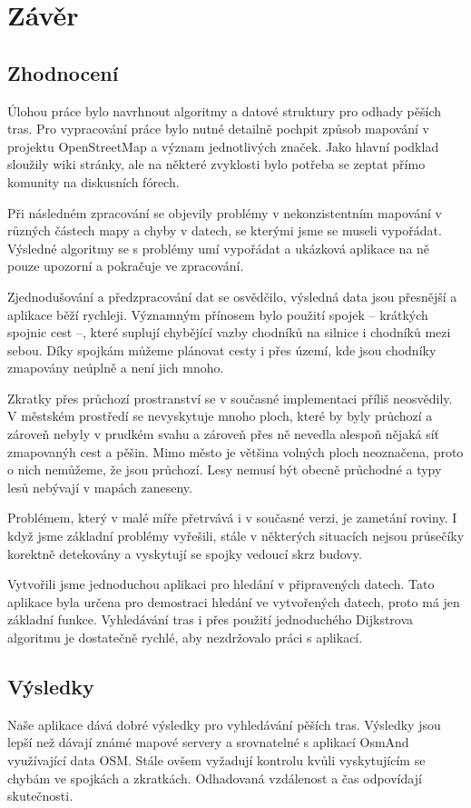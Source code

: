 \chapter*{Závěr}

\section{Zhodnocení}
Úlohou práce bylo navrhnout algoritmy a datové struktury pro odhady pěších tras.
Pro vypracování práce bylo nutné detailně pochpit způsob mapování v projektu
OpenStreetMap a význam jednotlivých značek. Jako hlavní podklad sloužily wiki
stránky, ale na některé zvyklosti bylo potřeba se zeptat přímo komunity na
diskusních fórech. 

Při následném zpracování se objevily problémy v nekonzistentním mapování v
různých částech mapy a chyby v datech, se kterými jsme se museli vypořádat.
Výsledné algoritmy se s problémy umí vypořádat a ukázková aplikace na ně pouze
upozorní a pokračuje ve zpracování. 

Zjednodušování a předzpracování dat se osvědčilo, výsledná data jsou přesnější a
aplikace běží rychleji. Významným přínosem bylo použití spojek -- krátkých
spojnic cest --, které suplují chybějící vazby chodníků na silnice i chodníků
mezi sebou. Díky spojkám můžeme plánovat cesty i přes území, kde jsou chodníky
zmapovány neúplně a není jich mnoho. 

Zkratky přes průchozí prostranství se v současné implementaci příliš neosvědily.
V městském prostředí se nevyskytuje mnoho ploch, které by byly průchozí a
zároveň nebyly v prudkém svahu a zároveň přes ně nevedla alespoň nějaká síť
zmapovanýh cest a pěšin. Mimo město je většina volných ploch neoznačena, proto o
nich nemůžeme, že jsou průchozí. Lesy nemusí být obecně průchodné a typy lesů
nebývají v mapách zaneseny. 

Problémem, který v malé míře přetrvává i v současné verzi, je zametání roviny.
I když jsme základní problémy vyřešili, stále v některých situacích nejsou
průsečíky korektně detekovány a vyskytují se spojky vedoucí skrz budovy.  

Vytvořili jsme jednoduchou aplikaci pro hledání v připravených datech. Tato
aplikace byla určena pro demostraci hledání ve vytvořených datech, proto má jen
základní funkce. Vyhledávání tras i přes použití jednoduchého Dijkstrova
algoritmu je dostatečně rychlé, aby nezdržovalo práci s aplikací. 

\section{Výsledky}
Naše aplikace dává dobré výsledky pro vyhledávání pěších tras. Výsledky jsou
lepší než dávají známé mapové servery a srovnatelné s aplikací OsmAnd
využívající data OSM. Stále ovšem vyžadují kontrolu kvůli vyskytujícím se chybám
ve spojkách a zkratkách. Odhadovaná vzdálenost a čas odpovídají skutečnosti. 


